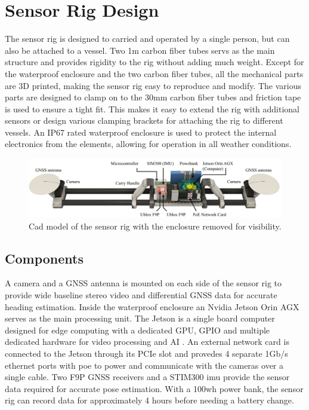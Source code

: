 \section{Sensor Rig Design}
The sensor rig is designed to carried and operated by a single person, but can also be attached to a vessel.
Two 1m carbon fiber tubes servs as the main structure and provides rigidity to the rig without adding much weight.
Except for the waterproof enclosure and the two carbon fiber tubes, all the mechanical parts are 3D printed, making the sensor rig easy to reproduce and modify.
The various parts are designed to clamp on to the 30mm carbon fiber tubes and friction tape is used to ensure a tight fit.
This makes it easy to extend the rig with additional sensors or design various clamping brackets for attaching the rig to different vessels.
An IP67 rated waterproof enclosure is used to protect the internal electronics from the elements, allowing for operation in all weather conditions.

\begin{figure}[H]
    \centering
    \includegraphics[width=\textwidth]{figures/rig_components.pdf}
    \caption{Cad model of the sensor rig with the enclosure removed for visibility.}
\end{figure}

\subsection{Components}
A camera and a GNSS antenna is mounted on each side of the sensor rig to provide wide baseline stereo video and differential GNSS data for accurate heading estimation.
Inside the waterproof enclosure an Nvidia Jetson Orin AGX serves as the main processing unit.
The Jetson is a single board computer designed for edge computing with a dedicated GPU, GPIO and multiple dedicated hardware for video processing and AI \cite{karumbunathanNVIDIAJetsonAGX2022}.
An external network card is connected to the Jetson through its PCIe slot and provedes 4 separate 1Gb/s ethernet ports with \gls{poe} to power and communicate with the cameras over a single cable.
Two F9P GNSS receivers and a STIM300 \gls{imu} provide the sensor data required for accurate pose estimation.
With a 100wh power bank, the sensor rig can record data for approximately 4 hours before needing a battery change.

